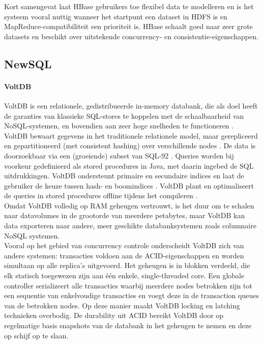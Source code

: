 Kort samengevat laat HBase gebruikers toe flexibel data te modelleren en is het systeem vooral nuttig wanneer het startpunt een dataset in HDFS is en MapReduce-compatibiliteit een prioriteit is. HBase schaalt goed naar zeer grote datasets en beschikt over uitstekende concurrency- en consistentie-eigenschappen.

\subsection{NewSQL} 

\paragraph{VoltDB}

VoltDB is een relationele, gedistribueerde in-memory databank, die als doel heeft de garanties van klassieke SQL-stores te koppelen met de schaalbaarheid van NoSQL-systemen, en bovendien aan zeer hoge snelheden te functioneren \cite{stonebraker2013voltdb}.\\
VoltDB bewaart gegevens in het traditionele relationele model, maar gerepliceerd en gepartitioneerd (met consistent hashing) over verschillende nodes \cite{grolinger2013data}. De data is doorzoekbaar via een (groeiende) subset van SQL-92 \cite{voltdb2010voltdb}. Queries worden bij voorkeur gedefinieerd als stored procedures in Java, met daarin ingebed de SQL uitdrukkingen. VoltDB ondersteunt primaire en secundaire indices en laat de gebruiker de keuze tussen hash- en boomindices \cite{voltdb_indexes}. VoltDB plant en optimaliseert de queries in stored procedures offline tijdens het compileren \cite{voltdb_query_plans}.\\
Omdat VoltDB volledig op RAM geheugen vertrouwt, is het duur om te schalen naar datavolumes in de grootorde van meerdere petabytes, maar VoltDB kan data exporteren naar andere, meer geschikte databanksystemen zoals columnaire NoSQL systemen.\\
Vooral op het gebied van concurrency controle onderscheidt VoltDB zich van andere systemen: transacties voldoen aan de ACID-eigenschappen en worden simultaan op alle replica's uitgevoerd. Het geheugen is in blokken verdeeld, die elk statisch toegewezen zijn aan \'e\'en enkele, single-threaded core. Een globale controller serializeert alle transacties waarbij meerdere nodes betrokken zijn tot een sequentie van enkelvoudige transacties en voegt deze in de transaction queues van de betrokken nodes. Op deze manier maakt VoltDB locking en latching technieken overbodig. De durability uit ACID bereikt VoltDB door op regelmatige basis snapshots van de databank in het geheugen te nemen en deze op schijf op te slaan.\\

